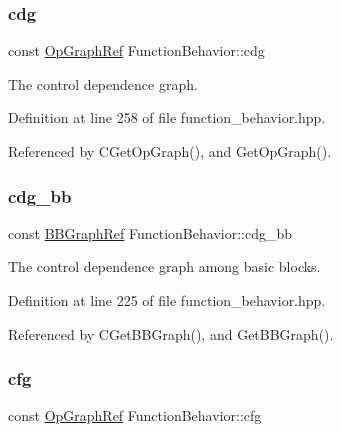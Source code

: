 \subsubsection{\texorpdfstring{cdg}{cdg}}
{\footnotesize\ttfamily const \hyperlink{op__graph_8hpp_aee97c95c40f791b60c451d9e29c72d39}{Op\+Graph\+Ref} Function\+Behavior\+::cdg\hspace{0.3cm}{\ttfamily [private]}}



The control dependence graph. 



Definition at line 258 of file function\+\_\+behavior.\+hpp.



Referenced by C\+Get\+Op\+Graph(), and Get\+Op\+Graph().

\mbox{\label{classFunctionBehavior_aea765c5e4164aabb2de06f124b094308}} 
\subsubsection{\texorpdfstring{cdg\+\_\+bb}{cdg\_bb}}
{\footnotesize\ttfamily const \hyperlink{basic__block_8hpp_a0e7f233d1b83cad0bfd5aa865f0d3532}{B\+B\+Graph\+Ref} Function\+Behavior\+::cdg\+\_\+bb\hspace{0.3cm}{\ttfamily [private]}}



The control dependence graph among basic blocks. 



Definition at line 225 of file function\+\_\+behavior.\+hpp.



Referenced by C\+Get\+B\+B\+Graph(), and Get\+B\+B\+Graph().

\mbox{\label{classFunctionBehavior_a7bf00873cbc76039ca84448e993dc970}} 
\subsubsection{\texorpdfstring{cfg}{cfg}}
{\footnotesize\ttfamily const \hyperlink{op__graph_8hpp_aee97c95c40f791b60c451d9e29c72d39}{Op\+Graph\+Ref} Function\+Behavior\+::cfg\hspace{0.3cm}{\ttfamily [private]}}



